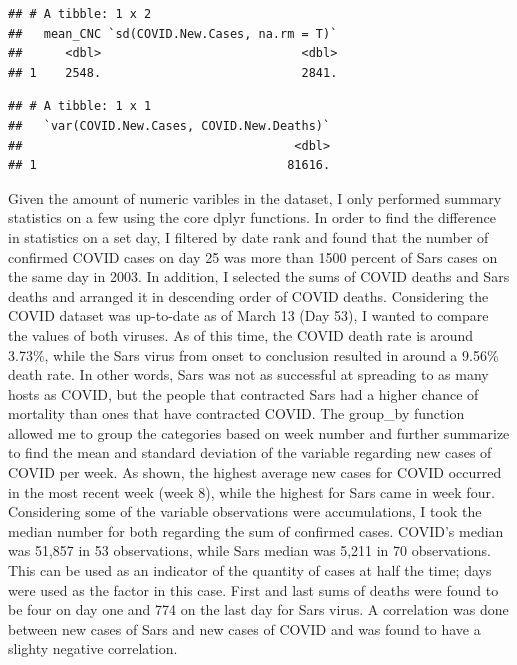 \documentclass[
]{article}
\newenvironment{Shaded}{\begin{snugshade}}{\end{snugshade}}
\newcommand{\KeywordTok}[1]{\textcolor[rgb]{0.13,0.29,0.53}{\textbf{#1}}}
\newcommand{\NormalTok}[1]{#1}
\newcommand{\OperatorTok}[1]{\textcolor[rgb]{0.81,0.36,0.00}{\textbf{#1}}}
\begin{document}
\begin{verbatim}
## # A tibble: 1 x 2
##   mean_CNC `sd(COVID.New.Cases, na.rm = T)`
##      <dbl>                            <dbl>
## 1    2548.                            2841.
\end{verbatim}

\begin{Shaded}
\end{Shaded}

\begin{verbatim}
## # A tibble: 1 x 1
##   `var(COVID.New.Cases, COVID.New.Deaths)`
##                                      <dbl>
## 1                                   81616.
\end{verbatim}

Given the amount of numeric varibles in the dataset, I only performed
summary statistics on a few using the core dplyr functions. In order to
find the difference in statistics on a set day, I filtered by date rank
and found that the number of confirmed COVID cases on day 25 was more
than 1500 percent of Sars cases on the same day in 2003. In addition, I
selected the sums of COVID deaths and Sars deaths and arranged it in
descending order of COVID deaths. Considering the COVID dataset was
up-to-date as of March 13 (Day 53), I wanted to compare the values of
both viruses. As of this time, the COVID death rate is around 3.73\%,
while the Sars virus from onset to conclusion resulted in around a
9.56\% death rate. In other words, Sars was not as successful at
spreading to as many hosts as COVID, but the people that contracted Sars
had a higher chance of mortality than ones that have contracted COVID.
The group\_by function allowed me to group the categories based on week
number and further summarize to find the mean and standard deviation of
the variable regarding new cases of COVID per week. As shown, the
highest average new cases for COVID occurred in the most recent week
(week 8), while the highest for Sars came in week four. Considering some
of the variable observations were accumulations, I took the median
number for both regarding the sum of confirmed cases. COVID's median was
51,857 in 53 observations, while Sars median was 5,211 in 70
observations. This can be used as an indicator of the quantity of cases
at half the time; days were used as the factor in this case. First and
last sums of deaths were found to be four on day one and 774 on the last
day for Sars virus. A correlation was done between new cases of Sars and
new cases of COVID and was found to have a slighty negative correlation.
\end{document}
